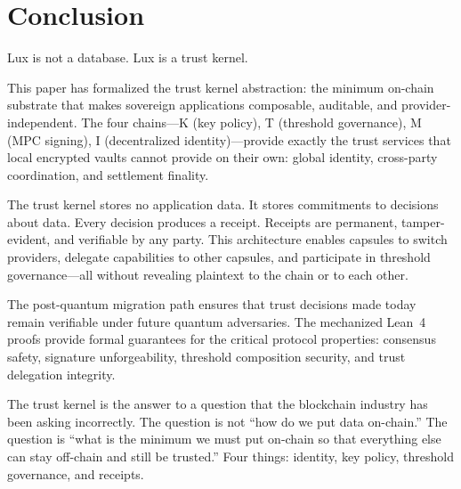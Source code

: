 \section{Conclusion}
\label{sec:conclusion}

Lux is not a database. Lux is a trust kernel.

This paper has formalized the trust kernel abstraction: the minimum on-chain
substrate that makes sovereign applications composable, auditable, and
provider-independent. The four chains---K (key policy), T (threshold governance),
M (MPC signing), I (decentralized identity)---provide exactly the trust services
that local encrypted vaults cannot provide on their own: global identity,
cross-party coordination, and settlement finality.

The trust kernel stores no application data. It stores commitments to
decisions about data. Every decision produces a receipt. Receipts are
permanent, tamper-evident, and verifiable by any party. This architecture
enables capsules to switch providers, delegate capabilities to other capsules,
and participate in threshold governance---all without revealing plaintext to
the chain or to each other.

The post-quantum migration path ensures that trust decisions made today remain
verifiable under future quantum adversaries. The mechanized Lean~4 proofs
provide formal guarantees for the critical protocol properties: consensus
safety, signature unforgeability, threshold composition security, and trust
delegation integrity.

The trust kernel is the answer to a question that the blockchain industry has
been asking incorrectly. The question is not ``how do we put data on-chain.''
The question is ``what is the minimum we must put on-chain so that everything
else can stay off-chain and still be trusted.'' Four things: identity, key
policy, threshold governance, and receipts.



